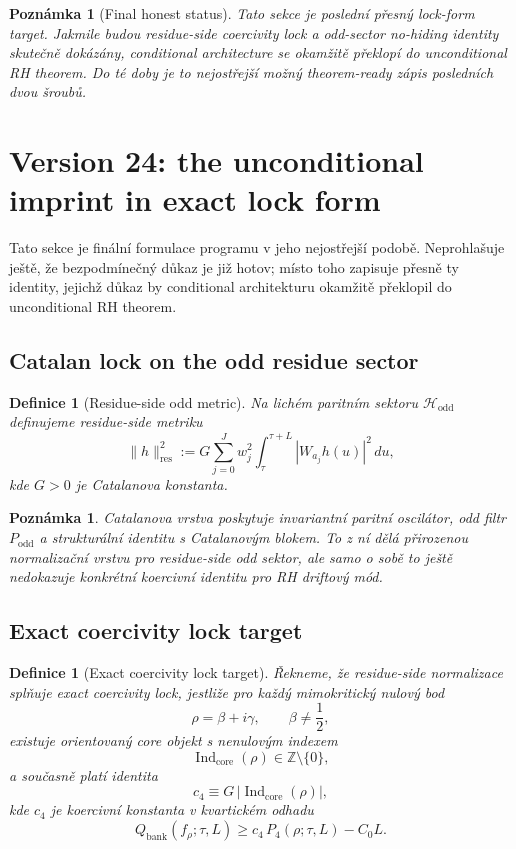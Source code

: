 \documentclass[11pt,a4paper]{article}
\newtheorem{definition}[theorem]{Definice}
\newtheorem{remark}[theorem]{Poznámka}
\begin{document}
\begin{remark}[Final honest status]
Tato sekce je poslední přesný lock-form target.
Jakmile budou residue-side coercivity lock a odd-sector no-hiding identity skutečně dokázány,
conditional architecture se okamžitě překlopí do unconditional RH theorem.
Do té doby je to nejostřejší možný theorem-ready zápis posledních dvou šroubů.
\end{remark}



\section{Version 24: the unconditional imprint in exact lock form}

Tato sekce je finální formulace programu v jeho nejostřejší podobě.
Neprohlašuje ještě, že bezpodmínečný důkaz je již hotov;
místo toho zapisuje přesně ty identity, jejichž důkaz by conditional architekturu
okamžitě překlopil do unconditional RH theorem.

\subsection*{Catalan lock on the odd residue sector}

\begin{definition}[Residue-side odd metric]
Na lichém paritním sektoru \(\mathcal H_{\mathrm{odd}}\) definujeme residue-side metriku
\[
\|h\|_{\mathrm{res}}^2
:=
G\sum_{j=0}^{J} w_j^2 \int_{\tau}^{\tau+L}|W_{a_j}h(u)|^2\,du,
\]
kde \(G>0\) je Catalanova konstanta.
\end{definition}

\begin{remark}
Catalanova vrstva poskytuje invariantní paritní oscilátor, odd filtr \(P_{\mathrm{odd}}\)
a strukturální identitu s Catalanovým blokem. To z ní dělá přirozenou normalizační vrstvu
pro residue-side odd sektor, ale samo o sobě to ještě nedokazuje konkrétní koercivní identitu
pro RH driftový mód.
\end{remark}

\subsection*{Exact coercivity lock target}

\begin{definition}[Exact coercivity lock target]
Řekneme, že residue-side normalizace splňuje \emph{exact coercivity lock}, jestliže pro každý
mimokritický nulový bod
\[
\rho=\beta+i\gamma,
\qquad
\beta\neq \frac12,
\]
existuje orientovaný core objekt s nenulovým indexem
\[
\operatorname{Ind}_{\mathrm{core}}(\rho)\in \mathbb Z\setminus\{0\},
\]
a současně platí identita
\[
c_4 \equiv G\,|\operatorname{Ind}_{\mathrm{core}}(\rho)|,
\]
kde \(c_4\) je koercivní konstanta v kvartickém odhadu
\[
Q_{\mathrm{bank}}(f_\rho;\tau,L)\ge c_4\,P_4(\rho;\tau,L)-C_0L.
\]
\end{definition}
\end{document}
